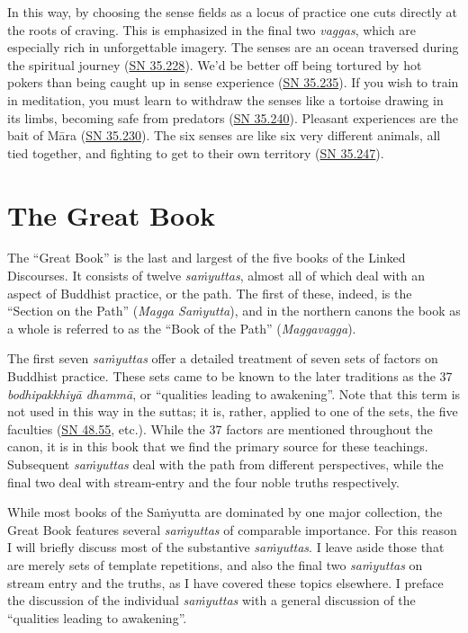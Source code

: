 \documentclass[12pt,openany]{book}%
\begin{document}
In this way, by choosing the sense fields as a locus of practice one cuts directly at the roots of craving. This is emphasized in the final two \textit{vaggas}, which are especially rich in unforgettable imagery. The senses are an ocean traversed during the spiritual journey (\href{https://suttacentral.net/sn35.228}{SN 35.228}). We’d be better off being tortured by hot pokers than being caught up in sense experience (\href{https://suttacentral.net/sn35.235}{SN 35.235}). If you wish to train in meditation, you must learn to withdraw the senses like a tortoise drawing in its limbs, becoming safe from predators (\href{https://suttacentral.net/sn35.240}{SN 35.240}). Pleasant experiences are the bait of \textsanskrit{Māra} (\href{https://suttacentral.net/sn35.230}{SN 35.230}). The six senses are like six very different animals, all tied together, and fighting to get to their own territory (\href{https://suttacentral.net/sn35.247}{SN 35.247}).

\section*{The Great Book}

The “Great Book” is the last and largest of the five books of the Linked Discourses. It consists of twelve \textit{\textsanskrit{saṁyuttas}}, almost all of which deal with an aspect of Buddhist practice, or the path. The first of these, indeed, is the “Section on the Path” (\textit{Magga \textsanskrit{Saṁyutta}}), and in the northern canons the book as a whole is referred to as the “Book of the Path” (\textit{Maggavagga}).

The first seven \textit{\textsanskrit{saṁyuttas}} offer a detailed treatment of seven sets of factors on Buddhist practice. These sets came to be known to the later traditions as the 37 \textit{\textsanskrit{bodhipakkhiyā} \textsanskrit{dhammā}}, or “qualities leading to awakening”. Note that this term is not used in this way in the suttas; it is, rather, applied to one of the sets, the five faculties (\href{https://suttacentral.net/sn48.55}{SN 48.55}, etc.). While the 37 factors are mentioned throughout the canon, it is in this book that we find the primary source for these teachings. Subsequent \textit{\textsanskrit{saṁyuttas}} deal with the path from different perspectives, while the final two deal with stream-entry and the four noble truths respectively.

While most books of the \textsanskrit{Saṁyutta} are dominated by one major collection, the Great Book features several \textit{\textsanskrit{saṁyuttas}} of comparable importance. For this reason I will briefly discuss most of the substantive \textit{\textsanskrit{saṁyuttas}}. I leave aside those that are merely sets of template repetitions, and also the final two \textit{\textsanskrit{saṁyuttas}} on stream entry and the truths, as I have covered these topics elsewhere. I preface the discussion of the individual \textit{\textsanskrit{saṁyuttas}} with a general discussion of the “qualities leading to awakening”.
\end{document}
